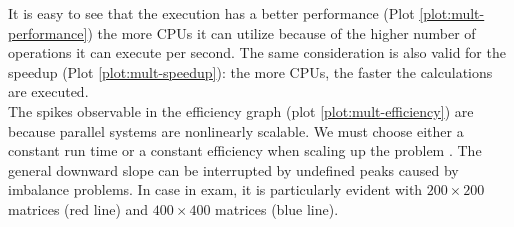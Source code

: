 It is easy to see that the execution has a better performance (Plot \ref{plot:mult-performance}) %
the more CPUs it can utilize because of the higher number of operations it can %
execute per second. The same consideration is also valid for the speedup %
(Plot \ref{plot:mult-speedup}): the more CPUs, the faster the calculations are %
executed. \\
The spikes observable in the efficiency graph (plot \ref{plot:mult-efficiency}) %
are because parallel systems are nonlinearly scalable. We must choose %
either a constant run time or a constant efficiency when scaling up the problem %
\cite{scalability}. The general downward slope can be interrupted by undefined %
peaks caused by imbalance problems. In case in exam, it is particularly evident with %
$200\times200$ matrices (red line) and $400\times400$ matrices (blue line).
